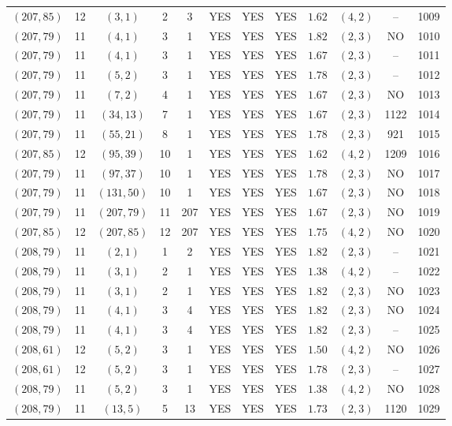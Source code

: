 \begin{longtable}{|c|c|c|c|c|c|c|c|c|c|c|c|}
$(207,85)$ & 12 & $(3,1)$ & 2 & 3 & YES & YES & YES & $1.62$ & $(4,2)$ & -- & 1009\\
$(207,79)$ & 11 & $(4,1)$ & 3 & 1 & YES & YES & YES & $1.82$ & $(2,3)$ & NO & 1010\\
$(207,79)$ & 11 & $(4,1)$ & 3 & 1 & YES & YES & YES & $1.67$ & $(2,3)$ & -- & 1011\\
$(207,79)$ & 11 & $(5,2)$ & 3 & 1 & YES & YES & YES & $1.78$ & $(2,3)$ & -- & 1012\\
$(207,79)$ & 11 & $(7,2)$ & 4 & 1 & YES & YES & YES & $1.67$ & $(2,3)$ & NO & 1013\\
$(207,79)$ & 11 & $(34,13)$ & 7 & 1 & YES & YES & YES & $1.67$ & $(2,3)$ & 1122 & 1014\\
$(207,79)$ & 11 & $(55,21)$ & 8 & 1 & YES & YES & YES & $1.78$ & $(2,3)$ & 921 & 1015\\
$(207,85)$ & 12 & $(95,39)$ & 10 & 1 & YES & YES & YES & $1.62$ & $(4,2)$ & 1209 & 1016\\
$(207,79)$ & 11 & $(97,37)$ & 10 & 1 & YES & YES & YES & $1.78$ & $(2,3)$ & NO & 1017\\
$(207,79)$ & 11 & $(131,50)$ & 10 & 1 & YES & YES & YES & $1.67$ & $(2,3)$ & NO & 1018\\
$(207,79)$ & 11 & $(207,79)$ & 11 & 207 & YES & YES & YES & $1.67$ & $(2,3)$ & NO & 1019\\
$(207,85)$ & 12 & $(207,85)$ & 12 & 207 & YES & YES & YES & $1.75$ & $(4,2)$ & NO & 1020\\
$(208,79)$ & 11 & $(2,1)$ & 1 & 2 & YES & YES & YES & $1.82$ & $(2,3)$ & -- & 1021\\
$(208,79)$ & 11 & $(3,1)$ & 2 & 1 & YES & YES & YES & $1.38$ & $(4,2)$ & -- & 1022\\
$(208,79)$ & 11 & $(3,1)$ & 2 & 1 & YES & YES & YES & $1.82$ & $(2,3)$ & NO & 1023\\
$(208,79)$ & 11 & $(4,1)$ & 3 & 4 & YES & YES & YES & $1.82$ & $(2,3)$ & NO & 1024\\
$(208,79)$ & 11 & $(4,1)$ & 3 & 4 & YES & YES & YES & $1.82$ & $(2,3)$ & -- & 1025\\
$(208,61)$ & 12 & $(5,2)$ & 3 & 1 & YES & YES & YES & $1.50$ & $(4,2)$ & NO & 1026\\
$(208,61)$ & 12 & $(5,2)$ & 3 & 1 & YES & YES & YES & $1.78$ & $(2,3)$ & -- & 1027\\
$(208,79)$ & 11 & $(5,2)$ & 3 & 1 & YES & YES & YES & $1.38$ & $(4,2)$ & NO & 1028\\
$(208,79)$ & 11 & $(13,5)$ & 5 & 13 & YES & YES & YES & $1.73$ & $(2,3)$ & 1120 & 1029\\

\end{longtable}
